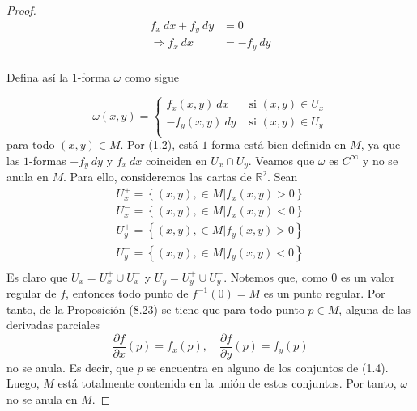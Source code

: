 \documentclass[12pt]{report}
\theoremstyle{largebreak}
\begin{document}
\begin{proof}
        \begin{equation}
            \begin{split}
                f_x\:dx+f_y\:dy&=0\\
                \Rightarrow f_x\:dx&=-f_y\:dy\\
            \end{split}
        \end{equation}

        Defina así la $1$-forma $\omega$ como sigue

        \begin{equation}
            \omega(x,y)=\left\{
                \begin{aligned}
                    f_x(x,y)\:dx & \text{ si }(x,y)\in U_x\\
                    -f_y(x,y)\:dy & \text{ si }(x,y)\in U_y\\
                \end{aligned} 
            \right.
        \end{equation}
        para todo $(x,y)\in M$. Por (1.2), está $1$-forma está bien definida en $M$, ya que las $1$-formas $-f_y\:dy$ y $f_x\:dx$ coinciden en $U_x\cap U_y$. Veamos que $\omega$ es $C^\infty$ y no se anula en $M$. Para ello, consideremos las cartas de $\mathbb{R}^2$. Sean
        \begin{equation}
            \begin{split}
                U_x^+=\left\{(x,y),\in M|f_x(x,y)>0\right\}\\
                U_x^-=\left\{(x,y),\in M|f_x(x,y)<0\right\}\\
                U_y^+= \left\{(x,y),\in M|f_y(x,y)>0\right\}\\
                U_y^-=\left\{(x,y),\in M|f_y(x,y)<0\right\}\\
        \end{split}
        \end{equation}
        Es claro que $U_x=U_x^+\cup U_x^-$ y $U_y=U_y^+\cup U_y^-$. Notemos que, como $0$ es un valor regular de $f$, entonces todo punto de $f^{-1}(0)=M$ es un punto regular. Por tanto, de la Proposición (8.23) se tiene que para todo punto $p\in M$, alguna de las derivadas parciales
        \begin{equation*}
            \frac{\partial f}{\partial x}(p)=f_x(p),\quad\frac{\partial f}{\partial y}(p)=f_y(p)
        \end{equation*}
        no se anula. Es decir, que $p$ se encuentra en alguno de los conjuntos de (1.4). Luego, $M$ está totalmente contenida en la unión de estos conjuntos. Por tanto, $\omega$ no se anula en $M$.
        

\end{proof}
\end{document}
